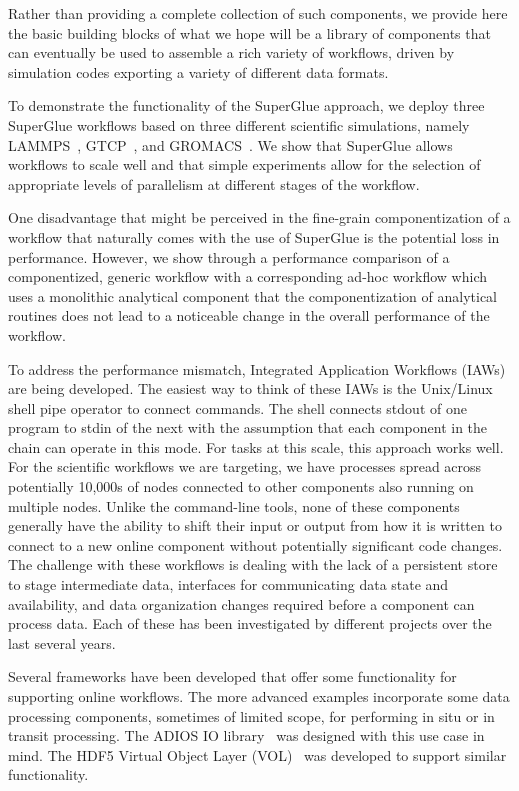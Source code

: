 Rather than providing a complete collection of such components,
we provide here the basic building
blocks of what we hope will be a library of components that can
eventually be used to assemble
a rich variety of workflows, driven by simulation codes
exporting a variety of different data formats.

To demonstrate the functionality of the SuperGlue approach,
we deploy three SuperGlue workflows based on three different
scientific simulations, namely
LAMMPS~\cite{plimpton:1997:lammps},
GTCP~\cite{lin:gtc},
and GROMACS~\cite{hess2008gromacs}.
We show that SuperGlue allows workflows to scale well and that
simple experiments allow for the selection of
appropriate levels of parallelism at different
stages of the workflow.

One disadvantage that might be perceived in the fine-grain componentization
of a workflow that naturally comes with the use of SuperGlue
is the potential loss in performance.
However, we show through a performance comparison of
a componentized, generic workflow with a corresponding
ad-hoc workflow which uses a monolithic analytical component
that the componentization of analytical routines
does not lead to a noticeable change in the
overall performance of the workflow.



To address the performance mismatch, Integrated Application Workflows (IAWs)
are being developed. The easiest way to think of these IAWs is the Unix/Linux
shell pipe operator to connect commands. The shell connects stdout of one
program to stdin of the next with the assumption that each component in the
chain can operate in this mode. For tasks at this scale, this approach works
well. For the scientific workflows we are targeting, we have processes spread
across potentially 10,000s of nodes connected to other components also running
on multiple nodes. Unlike the command-line tools, none of these components
generally have the ability to shift their input or output from how it is
written to connect to a new online component without potentially significant
code changes. The challenge with these workflows is dealing with the lack of a
persistent store to stage intermediate data, interfaces for communicating data
state and availability, and data organization changes required before a
component can process data.  Each of these has been investigated by different
projects over the last several years.

Several frameworks have been developed that offer some functionality for
supporting online workflows. The more advanced examples incorporate some data
processing components, sometimes of limited scope, for performing in situ or in
transit processing. The ADIOS IO library~\cite{lofstead:2009:adaptable} was designed with
this use case in mind. The HDF5 Virtual Object Layer
(VOL)~\cite{chaarawi:2013:hdf5-vol} was developed to support similar
functionality.

